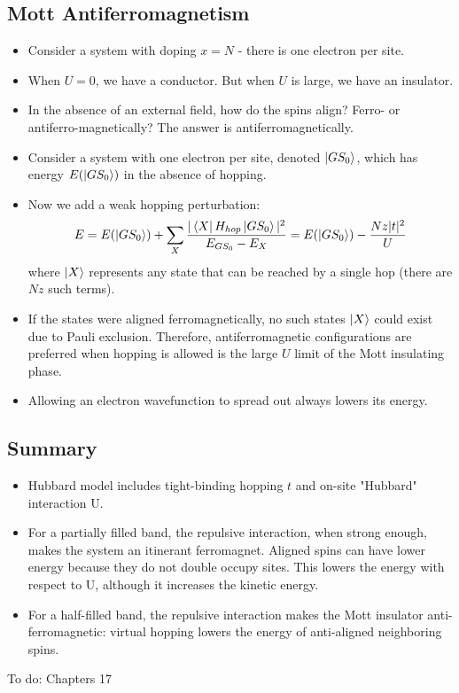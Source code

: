 \documentclass[10pt]{article}
\begin{document}
\subsection{Mott Antiferromagnetism}
\begin{itemize}
\item Consider a system with doping $x = N$ - there is one electron per site.
\item When $U = 0$, we have a conductor. But when $U$ is large, we have an insulator.
\item In the absence of an external field, how do the spins align? Ferro- or antiferro-magnetically?
The answer is antiferromagnetically.
\item Consider a system with one electron per site, denoted $\ket{GS_{0}}$, which has energy $E(\ket{GS_{0}})$ in
the absence of hopping.
\item Now we add a weak hopping perturbation:
$$
 E = E(\ket{GS_{0}}) + \sum_{X}\frac{|\bra{X}H_{hop}\ket{GS_{0}}|^{2}}{E_{GS_0} - E_{X}} = E(\ket{GS_{0}}) - \frac{Nz|t|^{2}}{U}
$$
where $\ket{X}$ represents any state that can be reached by a single hop (there are $Nz$ such terms).
\item If the states were aligned ferromagnetically, no such states $\ket{X}$ could exist due to Pauli exclusion. Therefore,
antiferromagnetic configurations are preferred when hopping is allowed is the large  $U$ limit of the Mott insulating phase.
\item Allowing an electron wavefunction to spread out always lowers its energy.
\end{itemize}

\subsection{Summary}
\begin{itemize}
  \item Hubbard model includes tight-binding hopping $t$ and on-site "Hubbard" interaction U.
  \item For a partially filled band, the repulsive interaction, when strong enough, makes the system
  an itinerant ferromagnet. Aligned spins can have lower energy because they do not double occupy sites.
  This lowers the energy with respect to U, although it increases the kinetic energy.
  \item For a half-filled band, the repulsive interaction makes the Mott insulator anti-ferromagnetic: virtual
  hopping lowers the energy of anti-aligned neighboring spins.
\end{itemize}


To do: Chapters 17
\end{document}
